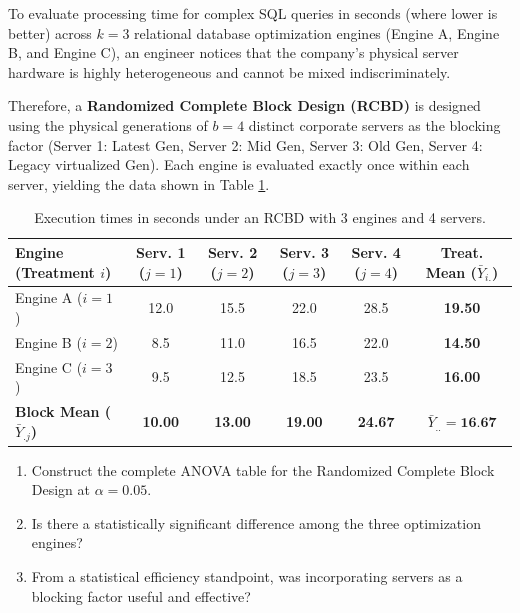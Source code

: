 \begin{problema}
	\label{prob:dbca_servidores}
	To evaluate processing time for complex SQL queries in seconds (where lower is better) across $k = 3$ relational database optimization engines (Engine A, Engine B, and Engine C), an engineer notices that the company's physical server hardware is highly heterogeneous and cannot be mixed indiscriminately.
	
	Therefore, a \textbf{Randomized Complete Block Design (RCBD)} is designed using the physical generations of $b = 4$ distinct corporate servers as the blocking factor (Server 1: Latest Gen, Server 2: Mid Gen, Server 3: Old Gen, Server 4: Legacy virtualized Gen). Each engine is evaluated exactly once within each server, yielding the data shown in Table \ref{tab:dbca_datos}.
	\begin{table}[h!]
		\centering
		\begin{tabular}{lccccc}
			\hline
			\textbf{Engine (Treatment $i$)} & \textbf{Serv. 1 ($j=1$)} & \textbf{Serv. 2 ($j=2$)} & \textbf{Serv. 3 ($j=3$)} & \textbf{Serv. 4 ($j=4$)} & \textbf{Treat. Mean ($\bar{Y}_{i.}$)} \\ \hline
			Engine A ($i=1$) & 12.0 & 15.5 & 22.0 & 28.5 & \textbf{19.50} \\
			Engine B ($i=2$) & 8.5 & 11.0 & 16.5 & 22.0 & \textbf{14.50} \\
			Engine C ($i=3$) & 9.5 & 12.5 & 18.5 & 23.5 & \textbf{16.00} \\ \hline
			\textbf{Block Mean ($\bar{Y}_{.j}$)} & \textbf{10.00} & \textbf{13.00} & \textbf{19.00} & \textbf{24.67} & $\bar{Y}_{..} = \textbf{16.67}$ \\ \hline
		\end{tabular}
		\caption{Execution times in seconds under an RCBD with 3 engines and 4 servers.}
		\label{tab:dbca_datos}
	\end{table}
	
	\begin{enumerate}
		\item Construct the complete ANOVA table for the Randomized Complete Block Design at $\alpha = 0.05$.
		\item Is there a statistically significant difference among the three optimization engines?
		\item From a statistical efficiency standpoint, was incorporating servers as a blocking factor useful and effective?
	\end{enumerate}
\end{problema}


